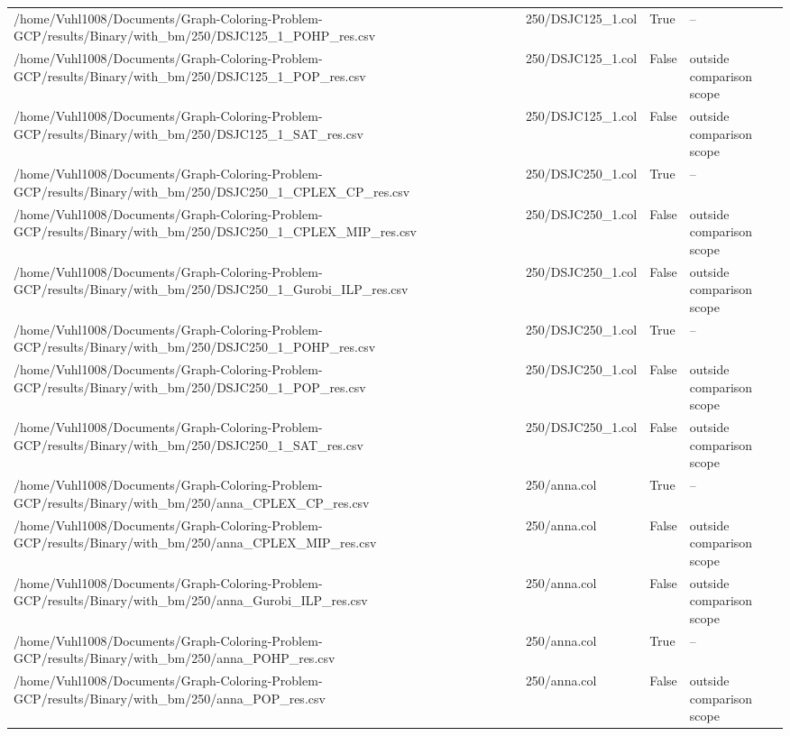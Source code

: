 \begin{table}[htbp]
\begin{tabular}{llll}
/home/Vuhl1008/Documents/Graph-Coloring-Problem-GCP/results/Binary/with\_bm/250/DSJC125\_1\_POHP\_res.csv & 250/DSJC125\_1.col & True & -- \\
/home/Vuhl1008/Documents/Graph-Coloring-Problem-GCP/results/Binary/with\_bm/250/DSJC125\_1\_POP\_res.csv & 250/DSJC125\_1.col & False & outside comparison scope \\
/home/Vuhl1008/Documents/Graph-Coloring-Problem-GCP/results/Binary/with\_bm/250/DSJC125\_1\_SAT\_res.csv & 250/DSJC125\_1.col & False & outside comparison scope \\
/home/Vuhl1008/Documents/Graph-Coloring-Problem-GCP/results/Binary/with\_bm/250/DSJC250\_1\_CPLEX\_CP\_res.csv & 250/DSJC250\_1.col & True & -- \\
/home/Vuhl1008/Documents/Graph-Coloring-Problem-GCP/results/Binary/with\_bm/250/DSJC250\_1\_CPLEX\_MIP\_res.csv & 250/DSJC250\_1.col & False & outside comparison scope \\
/home/Vuhl1008/Documents/Graph-Coloring-Problem-GCP/results/Binary/with\_bm/250/DSJC250\_1\_Gurobi\_ILP\_res.csv & 250/DSJC250\_1.col & False & outside comparison scope \\
/home/Vuhl1008/Documents/Graph-Coloring-Problem-GCP/results/Binary/with\_bm/250/DSJC250\_1\_POHP\_res.csv & 250/DSJC250\_1.col & True & -- \\
/home/Vuhl1008/Documents/Graph-Coloring-Problem-GCP/results/Binary/with\_bm/250/DSJC250\_1\_POP\_res.csv & 250/DSJC250\_1.col & False & outside comparison scope \\
/home/Vuhl1008/Documents/Graph-Coloring-Problem-GCP/results/Binary/with\_bm/250/DSJC250\_1\_SAT\_res.csv & 250/DSJC250\_1.col & False & outside comparison scope \\
/home/Vuhl1008/Documents/Graph-Coloring-Problem-GCP/results/Binary/with\_bm/250/anna\_CPLEX\_CP\_res.csv & 250/anna.col & True & -- \\
/home/Vuhl1008/Documents/Graph-Coloring-Problem-GCP/results/Binary/with\_bm/250/anna\_CPLEX\_MIP\_res.csv & 250/anna.col & False & outside comparison scope \\
/home/Vuhl1008/Documents/Graph-Coloring-Problem-GCP/results/Binary/with\_bm/250/anna\_Gurobi\_ILP\_res.csv & 250/anna.col & False & outside comparison scope \\
/home/Vuhl1008/Documents/Graph-Coloring-Problem-GCP/results/Binary/with\_bm/250/anna\_POHP\_res.csv & 250/anna.col & True & -- \\
/home/Vuhl1008/Documents/Graph-Coloring-Problem-GCP/results/Binary/with\_bm/250/anna\_POP\_res.csv & 250/anna.col & False & outside comparison scope \\

\end{tabular}
\end{table}
